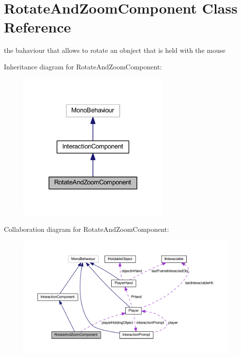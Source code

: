 \hypertarget{class_rotate_and_zoom_component}{}\section{Rotate\+And\+Zoom\+Component Class Reference}
\label{class_rotate_and_zoom_component}


the bahaviour that allows to rotate an obnject that is held with the mouse  




Inheritance diagram for Rotate\+And\+Zoom\+Component\+:
\nopagebreak
\begin{figure}[H]
\begin{center}
\leavevmode
\includegraphics[width=216pt]{class_rotate_and_zoom_component__inherit__graph}
\end{center}
\end{figure}


Collaboration diagram for Rotate\+And\+Zoom\+Component\+:
\nopagebreak
\begin{figure}[H]
\begin{center}
\leavevmode
\includegraphics[width=350pt]{class_rotate_and_zoom_component__coll__graph}
\end{center}
\end{figure}
